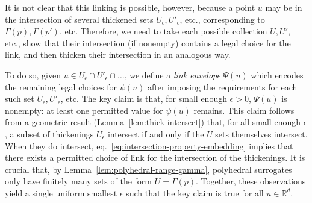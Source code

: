 \documentclass[twoside,11pt]{article}
\newcommand{\reals}{\mathbb{R}}
\begin{document}
It is not clear that this linking is possible, however, because a point $u$ may be in the intersection of several thickened sets $U_{\epsilon}, U'_{\epsilon}$, etc., corresponding to $\Gamma(p), \Gamma(p')$, etc.
Therefore, we need to take each possible collection $U,U'$, etc., show that their intersection (if nonempty) contains a legal choice for the link, and then thicken their intersection in an analogous way.

To do so, given $u \in U_\epsilon \cap U'_\epsilon \cap \dots$, we define a \emph{link envelope} $\Psi(u)$ which encodes the remaining legal choices for $\psi(u)$ after imposing the requirements for each such set $U_\epsilon,U'_\epsilon$, etc.
The key claim is that, for small enough $\epsilon > 0$, $\Psi(u)$ is nonempty: at least one permitted value for $\psi(u)$ remains.
This claim follows from a geometric result (Lemma~\ref{lem:thick-intersect}) that, for all small enough $\epsilon$, a subset of thickenings $U_{\epsilon}$ intersect if and only if the $U$ sets themselves intersect.
When they do intersect, eq.~\eqref{eq:intersection-property-embedding} implies that there exists a permitted choice of link for the intersection of the thickenings.
It is crucial that, by Lemma~\ref{lem:polyhedral-range-gamma}, polyhedral surrogates only have finitely many sets of the form $U = \Gamma(p)$.
Together, these observations yield a single uniform smallest $\epsilon$ such that the key claim is true for all $u \in \reals^d$.
\end{document}
